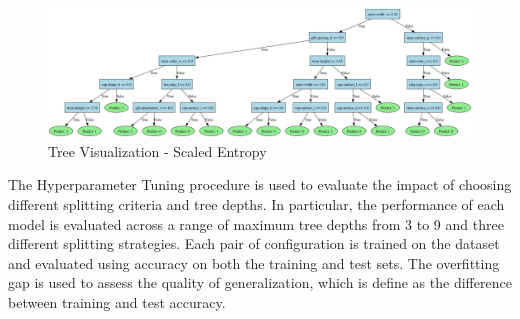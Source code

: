 \documentclass{article}
\begin{document}
\begin{figure}[H]
\centering
\includegraphics[width=1\linewidth]{Tree_Visual_SE.jpg}
\caption{\label{fig:frog}Tree Visualization - Scaled Entropy}
\end{figure}

The Hyperparameter Tuning procedure is used to evaluate the impact of choosing different splitting criteria and tree depths. In particular, the performance of each model is evaluated across a range of maximum tree depths from 3 to 9 and three different splitting strategies. Each pair of configuration is trained on the dataset and evaluated using accuracy on both the training and test sets. The overfitting gap is used to assess the quality of generalization, which is define as the difference between training and test accuracy.
\end{document}
